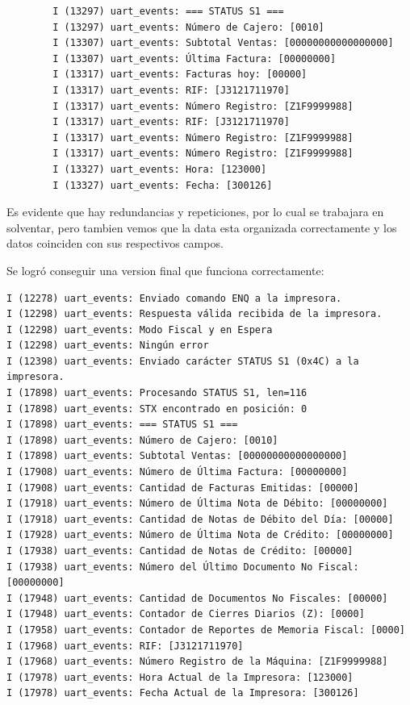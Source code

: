 \documentclass[12pt, a4paper]{article}
\begin{document}
    \newpage

    \begin{verbatim}
        I (13297) uart_events: === STATUS S1 ===
        I (13297) uart_events: Número de Cajero: [0010]
        I (13307) uart_events: Subtotal Ventas: [00000000000000000]
        I (13307) uart_events: Última Factura: [00000000]
        I (13317) uart_events: Facturas hoy: [00000]
        I (13317) uart_events: RIF: [J3121711970]
        I (13317) uart_events: Número Registro: [Z1F9999988]
        I (13317) uart_events: RIF: [J3121711970]
        I (13317) uart_events: Número Registro: [Z1F9999988]
        I (13317) uart_events: Número Registro: [Z1F9999988]
        I (13327) uart_events: Hora: [123000]
        I (13327) uart_events: Fecha: [300126]
    \end{verbatim}  

    Es evidente que hay redundancias y repeticiones, por lo cual se trabajara en solventar, pero tambien vemos que la data esta organizada correctamente y los datos coinciden con sus respectivos campos.

    Se logró conseguir una version final que funciona correctamente:

    \begin{verbatim}
I (12278) uart_events: Enviado comando ENQ a la impresora.
I (12298) uart_events: Respuesta válida recibida de la impresora.
I (12298) uart_events: Modo Fiscal y en Espera
I (12298) uart_events: Ningún error
I (12398) uart_events: Enviado carácter STATUS S1 (0x4C) a la impresora.
I (17898) uart_events: Procesando STATUS S1, len=116
I (17898) uart_events: STX encontrado en posición: 0
I (17898) uart_events: === STATUS S1 ===
I (17898) uart_events: Número de Cajero: [0010]
I (17898) uart_events: Subtotal Ventas: [00000000000000000]
I (17908) uart_events: Número de Última Factura: [00000000]
I (17908) uart_events: Cantidad de Facturas Emitidas: [00000]
I (17918) uart_events: Número de Última Nota de Débito: [00000000]
I (17918) uart_events: Cantidad de Notas de Débito del Día: [00000]
I (17928) uart_events: Número de Última Nota de Crédito: [00000000]
I (17938) uart_events: Cantidad de Notas de Crédito: [00000]
I (17938) uart_events: Número del Último Documento No Fiscal: [00000000]
I (17948) uart_events: Cantidad de Documentos No Fiscales: [00000]
I (17948) uart_events: Contador de Cierres Diarios (Z): [0000]
I (17958) uart_events: Contador de Reportes de Memoria Fiscal: [0000]
I (17968) uart_events: RIF: [J3121711970]
I (17968) uart_events: Número Registro de la Máquina: [Z1F9999988]
I (17978) uart_events: Hora Actual de la Impresora: [123000]
I (17978) uart_events: Fecha Actual de la Impresora: [300126]
    \end{verbatim}
\end{document}

